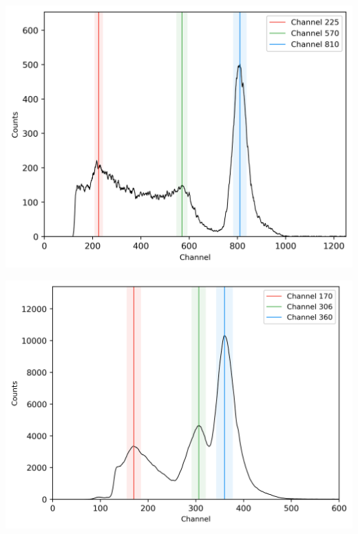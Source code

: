 \begin{multicols}{2}
\begin{center}
\begin{adjustbox}{max width=\linewidth, keepaspectratio}
        \end{adjustbox}
        \label{fig:Spectrum137Cs}
    \end{center}
\endminipage
%
\vspace{10mm}
%
\minipage{\linewidth}
    \begin{center}
        \captionsetup{type=figure}
        \begin{adjustbox}{max width=\linewidth, keepaspectratio}
            \includegraphics[]{png/54Mn}
        \end{adjustbox}
        \label{fig:Spectrum54Mn}
    \end{center}
\endminipage
%
\vspace{10mm}
%
\minipage{\linewidth}
    \begin{center}
        \captionsetup{type=figure}
        \begin{adjustbox}{max width=\linewidth, keepaspectratio}
            \includegraphics[]{png/133Ba}

\end{adjustbox}
\end{center}
\end{multicols}
